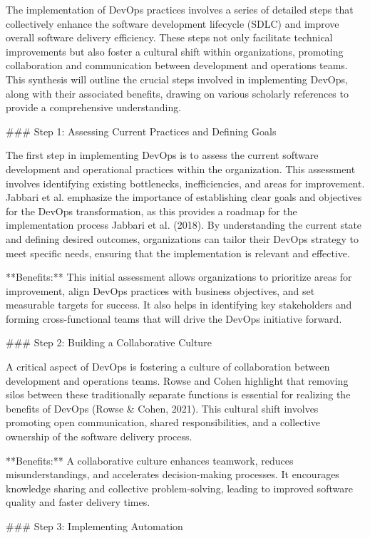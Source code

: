 The implementation of DevOps practices involves a series of detailed steps that collectively enhance the software development lifecycle (SDLC) and improve overall software delivery efficiency. These steps not only facilitate technical improvements but also foster a cultural shift within organizations, promoting collaboration and communication between development and operations teams. This synthesis will outline the crucial steps involved in implementing DevOps, along with their associated benefits, drawing on various scholarly references to provide a comprehensive understanding.

### Step 1: Assessing Current Practices and Defining Goals

The first step in implementing DevOps is to assess the current software development and operational practices within the organization. This assessment involves identifying existing bottlenecks, inefficiencies, and areas for improvement. Jabbari et al. emphasize the importance of establishing clear goals and objectives for the DevOps transformation, as this provides a roadmap for the implementation process Jabbari et al. (2018). By understanding the current state and defining desired outcomes, organizations can tailor their DevOps strategy to meet specific needs, ensuring that the implementation is relevant and effective.

**Benefits:** This initial assessment allows organizations to prioritize areas for improvement, align DevOps practices with business objectives, and set measurable targets for success. It also helps in identifying key stakeholders and forming cross-functional teams that will drive the DevOps initiative forward.

### Step 2: Building a Collaborative Culture

A critical aspect of DevOps is fostering a culture of collaboration between development and operations teams. Rowse and Cohen highlight that removing silos between these traditionally separate functions is essential for realizing the benefits of DevOps (Rowse & Cohen, 2021). This cultural shift involves promoting open communication, shared responsibilities, and a collective ownership of the software delivery process.

**Benefits:** A collaborative culture enhances teamwork, reduces misunderstandings, and accelerates decision-making processes. It encourages knowledge sharing and collective problem-solving, leading to improved software quality and faster delivery times.

### Step 3: Implementing Automation

